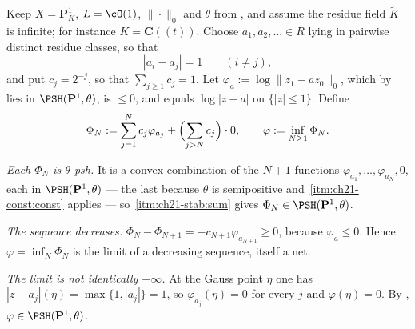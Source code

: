 \begin{example}
\label{ex:ch21-polar-noncompact}
Keep $X=\mathbf P^1_K$, $L=\cO(1)$, $\|\cdot\|_0$ and $\theta$ from
, and assume the residue field
$\widetilde K$ is infinite; for instance $K=\mathbf C((t))$.  Choose
$a_1,a_2,\ldots\in R$ lying in pairwise distinct residue classes, so that
\begin{equation}
\label{eq:ch21-separated-centres}
 |a_i-a_j|=1\qquad(i\neq j),
\end{equation}
and put $c_j=2^{-j}$, so that $\sum_{j\geq1}c_j=1$.  Let
$\varphi_{a}:=\log\lVert z_1-az_0\rVert_0$, which by
 lies in $\PSH(\mathbf P^1,\theta)$, is
$\leq0$, and equals $\log|z-a|$ on $\{|z|\leq1\}$.  Define
\begin{equation}
\label{eq:ch21-polar-series}
 \Phi_N:=\sum_{j=1}^{N}c_j\varphi_{a_j}
        +\Bigl(\sum_{j>N}c_j\Bigr)\cdot 0,
 \qquad
 \varphi:=\inf_{N\geq1}\Phi_N .
\end{equation}

\emph{Each $\Phi_N$ is $\theta$-psh.}  It is a convex combination of the
$N+1$ functions $\varphi_{a_1},\ldots,\varphi_{a_N},0$, each in
$\PSH(\mathbf P^1,\theta)$ --- the last because $\theta$ is semipositive
and \,\cref{itm:ch21-const:const} applies --- so
\,\cref{itm:ch21-stab:sum} gives
$\Phi_N\in\PSH(\mathbf P^1,\theta)$.

\emph{The sequence decreases.}  $\Phi_N-\Phi_{N+1}
=-c_{N+1}\varphi_{a_{N+1}}\geq0$, because
$\varphi_{a}\leq0$.  Hence $\varphi=\inf_N\Phi_N$ is the limit of a
decreasing sequence, itself a net.

\emph{The limit is not identically $-\infty$.}  At the Gauss point
$\eta$ one has $|z-a_j|(\eta)=\max\{1,|a_j|\}=1$, so
$\varphi_{a_j}(\eta)=0$ for every $j$ and $\varphi(\eta)=0$.  By
,
$\varphi\in\PSH(\mathbf P^1,\theta)$.


\end{example}
